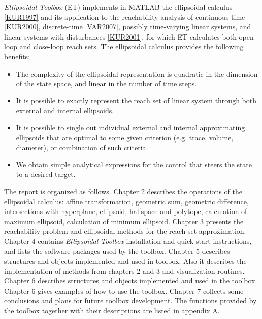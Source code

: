 \documentclass[letterpaper,10pt,english]{sphinxmanual}
\begin{document}
\emph{Ellipsoidal Toolbox} (ET) implements in MATLAB the ellipsoidal calculus
{\hyperref[main_source:kur1997]{{[}KUR1997{]}}} and its application to the reachability
analysis of continuous-time {\hyperref[main_source:kur2000]{{[}KUR2000{]}}}, discrete-time
{\hyperref[main_source:var2007]{{[}VAR2007{]}}}, possibly time-varying linear systems, and
linear systems with disturbances {\hyperref[main_source:kur2001]{{[}KUR2001{]}}},
for which ET calculates both open-loop and close-loop reach sets. The
ellipsoidal calculus provides the following benefits:
\begin{itemize}
\item {} 
The complexity of the ellipsoidal representation is quadratic in the
dimension of the state space, and linear in the number of time steps.

\item {} 
It is possible to exactly represent the reach set of linear system
through both external and internal ellipsoids.

\item {} 
It is possible to single out individual external and internal
approximating ellipsoids that are optimal to some given criterion
(e.g. trace, volume, diameter), or combination of such criteria.

\item {} 
We obtain simple analytical expressions for the control that steers
the state to a desired target.

\end{itemize}

The report is organized as follows. Chapter 2 describes the operations
of the ellipsoidal calculus: affine transformation, geometric sum,
geometric difference, intersections with hyperplane, ellipsoid,
halfspace and polytope, calculation of maximum ellipsoid, calculation of
minimum ellipsoid. Chapter 3 presents the reachability problem and
ellipsoidal methods for the reach set approximation. Chapter 4 contains
\emph{Ellipsoidal Toolbox} installation and quick start instructions, and
lists the software packages used by the toolbox. Chapter 5 describes
structures and objects implemented and used in toolbox. Also it
describes the implementation of methods from chapters 2 and 3 and
visualization routines. Chapter 6 describes structures and objects
implemented and used in the toolbox. Chapter 6 gives examples of how to
use the toolbox. Chapter 7 collects some conclusions and plans for
future toolbox development. The functions provided by the toolbox
together with their descriptions are listed in appendix A.
\end{document}
